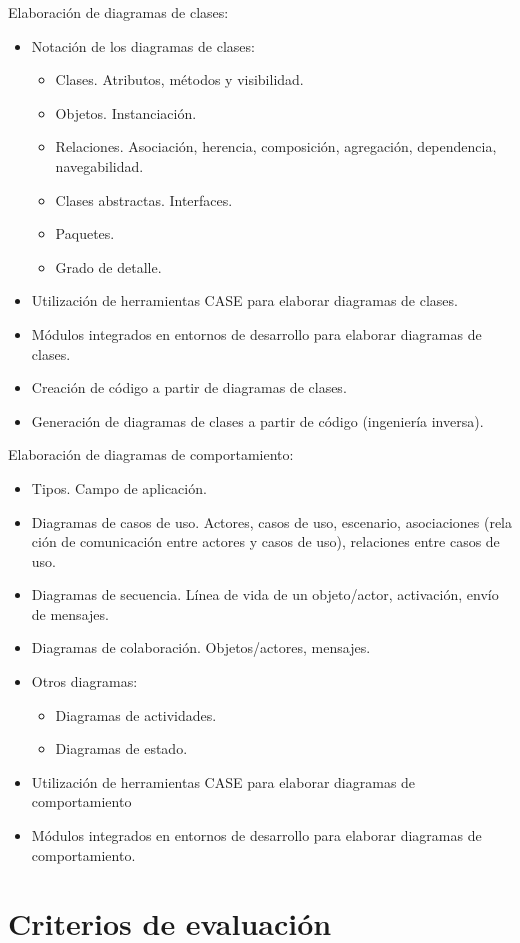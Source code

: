 \documentclass[a4paper]{article}
\begin{document}
Elaboración de diagramas de clases:
\begin{itemize}
\item Notación de los diagramas de clases:
\begin{itemize}
\item Clases. Atributos, métodos y visibilidad.
\item Objetos. Instanciación.
\item Relaciones. Asociación, herencia, composición, agregación, dependencia, navegabilidad.
\item Clases abstractas. Interfaces.
\item Paquetes.
\item Grado de detalle.
\end{itemize}
\item Utilización de herramientas CASE para elaborar diagramas de clases.
\item Módulos integrados en entornos de desarrollo para elaborar diagramas de clases.
\item Creación de código a partir de diagramas de clases.
\item Generación de diagramas de clases a partir de código (ingeniería inversa).
\end{itemize}

Elaboración de diagramas de comportamiento:
\begin{itemize}
\item Tipos. Campo de aplicación.
\item Diagramas de casos de uso. Actores, casos de uso, escenario, asociaciones (rela ción de comunicación entre actores y casos de uso), relaciones entre casos de uso.
\item Diagramas de secuencia. Línea de vida de un objeto/actor, activación, envío de mensajes.
\item Diagramas de colaboración. Objetos/actores, mensajes.
\item Otros diagramas:
\begin{itemize}
\item Diagramas de actividades.
\item Diagramas de estado.
\end{itemize}
\item Utilización de herramientas CASE para elaborar diagramas de comportamiento
\item Módulos integrados en entornos de desarrollo para elaborar diagramas de comportamiento.
\end{itemize}
\section{Criterios de evaluación}
\label{sec:org000002a}
\end{document}
